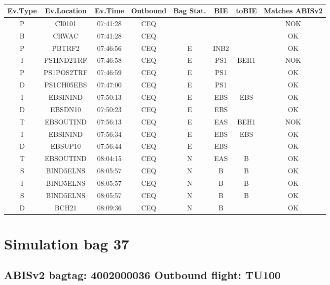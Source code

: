 \documentclass{report}
\begin{document}
\paragraph{}
\begin{longtable}{cccccccc}    \toprule
\rowcolor{white!50}
\textbf{Ev.Type} & \textbf{Ev.Location} & \textbf{Ev.Time} & \textbf{Outbound} & \textbf{Bag Stat.} & \textbf{BIE} & \textbf{toBIE} & \textbf{Matches ABISv2} \\\midrule
P & CI0101 & 07:41:28  & CEQ &  &  &  & NOK\\
B & CRWAC & 07:41:28  & CEQ &  &  &  & OK\\
P & PBTRF2 & 07:46:56  & CEQ & E & INB2 &  & OK\\
I & PS1IND2TRF & 07:46:58  & CEQ & E & PS1 & BEH1 & NOK\\
P & PS1POS2TRF & 07:46:59  & CEQ & E & PS1 &  & OK\\
D & PS1CH05EBS & 07:47:00  & CEQ & E & PS1 &  & OK\\
I & EBSININD & 07:50:13  & CEQ & E & EBS & EBS & OK\\
D & EBSDN10 & 07:50:23  & CEQ & E & EBS &  & OK\\
T & EBSOUTIND & 07:56:13  & CEQ & E & EAS & BEH1 & NOK\\
I & EBSININD & 07:56:34  & CEQ & E & EBS & EBS & OK\\
D & EBSUP10 & 07:56:44  & CEQ & E & EBS &  & OK\\
T & EBSOUTIND & 08:04:15  & CEQ & N & EAS & B & OK\\
S & BIND5ELNS & 08:05:57  & CEQ & N & B & B & OK\\
I & BIND5ELNS & 08:05:57  & CEQ & N & B & B & OK\\
S & BIND5ELNS & 08:05:57  & CEQ & N & B & B & OK\\
D & BCH21 & 08:09:36  & CEQ & N & B &  & OK\\
\bottomrule
\end{longtable}
\pagebreak
\section*{Simulation bag 37}
\subsection*{ABISv2 bagtag: 4002000036 Outbound flight: TU100}
\end{document}
